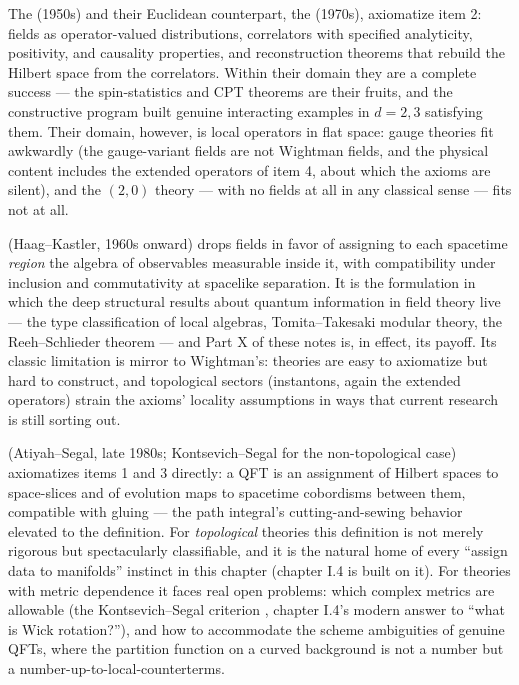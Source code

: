 The  (1950s) and their Euclidean counterpart, the
 (1970s), axiomatize item 2: fields as
operator-valued distributions, correlators with specified analyticity,
positivity, and causality properties, and reconstruction theorems that rebuild
the Hilbert space from the correlators. Within their domain they are a complete
success --- the spin-statistics and CPT theorems are their fruits, and the
constructive program built genuine interacting examples in $d = 2, 3$ satisfying
them. Their domain, however, is local operators in flat space: gauge theories
fit awkwardly (the gauge-variant fields are not Wightman fields, and the
physical content includes the extended operators of item 4, about which the
axioms are silent), and the $(2,0)$ theory --- with no fields at all in any
classical sense --- fits not at all.

 (Haag--Kastler, 1960s onward) drops fields in favor of
assigning to each spacetime \emph{region} the algebra of observables measurable
inside it, with compatibility under inclusion and commutativity at spacelike
separation. It is the formulation in which the deep structural results about
quantum information in field theory live --- the type classification of local
algebras, Tomita--Takesaki modular theory, the Reeh--Schlieder theorem --- and
Part X of these notes is, in effect, its payoff. Its classic limitation is
mirror to Wightman's: theories are easy to axiomatize but hard to construct, and
topological sectors (instantons, again the extended operators) strain the
axioms' locality assumptions in ways that current research is still sorting out.

 (Atiyah--Segal, late 1980s; Kontsevich--Segal for the
non-topological case) axiomatizes items 1 and 3 directly: a QFT is an assignment
of Hilbert spaces to space-slices and of evolution maps to spacetime cobordisms
between them, compatible with gluing --- the path integral's cutting-and-sewing
behavior elevated to the definition. For \emph{topological} theories this
definition is not merely rigorous but spectacularly classifiable, and it is the
natural home of every ``assign data to manifolds'' instinct in this chapter
(chapter I.4 is built on it). For theories with metric dependence it faces real
open problems: which complex metrics are allowable (the Kontsevich--Segal
criterion , chapter I.4's modern answer to ``what is Wick
rotation?''), and how to accommodate the scheme ambiguities of genuine QFTs,
where the partition function on a curved background is not a number but a
number-up-to-local-counterterms.

